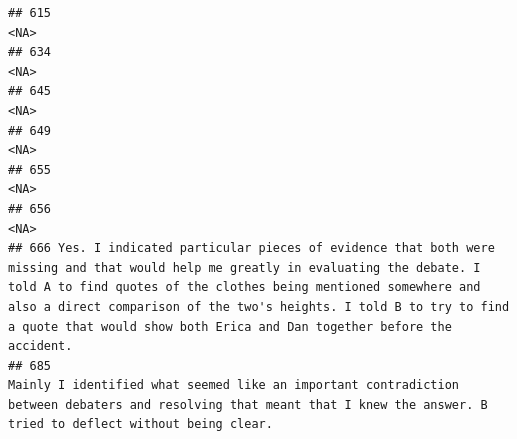 \documentclass[
]{article}
\begin{document}
\begin{verbatim}
## 615                                                                                                                                                                                                                                                                                                                                                <NA>
## 634                                                                                                                                                                                                                                                                                                                                                <NA>
## 645                                                                                                                                                                                                                                                                                                                                                <NA>
## 649                                                                                                                                                                                                                                                                                                                                                <NA>
## 655                                                                                                                                                                                                                                                                                                                                                <NA>
## 656                                                                                                                                                                                                                                                                                                                                                <NA>
## 666 Yes. I indicated particular pieces of evidence that both were missing and that would help me greatly in evaluating the debate. I told A to find quotes of the clothes being mentioned somewhere and also a direct comparison of the two's heights. I told B to try to find a quote that would show both Erica and Dan together before the accident.
## 685                                                                                                                                                                          Mainly I identified what seemed like an important contradiction between debaters and resolving that meant that I knew the answer. B tried to deflect without being clear. 

\end{verbatim}
\end{document}
